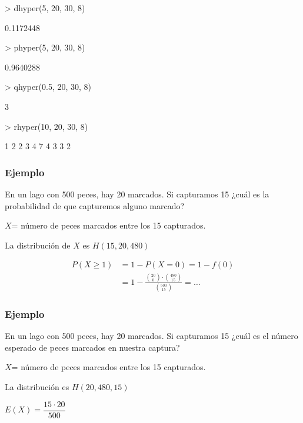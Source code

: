 \begin{frame}[fragile]
\begin{Schunk}
\begin{Sinput}
> dhyper(5, 20, 30, 8)
\end{Sinput}
\begin{Soutput}
[1] 0.1172448
\end{Soutput}
\begin{Sinput}
> phyper(5, 20, 30, 8)
\end{Sinput}
\begin{Soutput}
[1] 0.9640288
\end{Soutput}
\begin{Sinput}
> qhyper(0.5, 20, 30, 8)
\end{Sinput}
\begin{Soutput}
[1] 3
\end{Soutput}
\begin{Sinput}
> rhyper(10, 20, 30, 8)
\end{Sinput}
\begin{Soutput}
 [1] 1 2 2 3 4 7 4 3 3 2
\end{Soutput}
\end{Schunk}
\end{frame}

\begin{frame}
\frametitle{Ejemplo}
 En un lago con   500 peces, hay 20  marcados. Si capturamos 15 ¿cuál es  la probabilidad de que capturemos alguno marcado?
\medskip

$X$= número de peces marcados entre los 15  capturados.
\medskip

La distribución de $X$ es  $H(15,20,480)$
\medskip

$$
\begin{array}{rl}
P(X\geq 1) & =1-P(X=0)=1-f(0)\\[2ex]
& \displaystyle =1-\frac{\binom{20}{0}\cdot \binom{480}{15}}{\binom{500}{15}}=\ldots
\end{array}
$$
\end{frame}


\begin{frame}
\frametitle{Ejemplo}

 En un lago con   500 peces, hay 20  marcados. Si  capturamos 15  ¿cuál es  el número esperado de  peces marcados en nuestra captura?
\medskip

$X$= número de peces marcados entre los 15  capturados.
\medskip

La distribución es $H(20,480,15)$
\medskip

$E(X)=\dfrac{15\cdot 20}{500}$
\end{frame}


